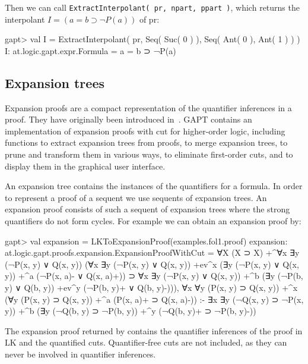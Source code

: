 \documentclass[a4paper,11pt]{article}
\newcommand{\impl}{\supset} %
\renewcommand{\lnot}{\neg}
\newcommand{\cli}[1]{{\ttfamily {#1}}}
\begin{document}
Then we can call \texttt{ExtractInterpolant( pr, npart, ppart )}, which returns the interpolant $I = (a=b \impl \lnot P(a))$ of pr:
\begin{clilisting}
gapt> val I = ExtractInterpolant( pr, Seq( Suc( 0 ) ), Seq( Ant( 0 ), Ant( 1 ) ) )
I: at.logic.gapt.expr.Formula = a = b ⊃ ¬P(a)

\end{clilisting}

\subsection{Expansion trees}

Expansion proofs are a compact representation of the quantifier inferences in a
proof.  They have originally been introduced in~\cite{Miller87Compact}.  GAPT
contains an implementation of expansion proofs with cut for higher-order logic,
including functions to extract expansion trees from proofs, to merge expansion
trees, to prune and transform them in various ways, to eliminate first-order
cuts, and to display them in the graphical user interface.

An expansion tree contains the instances of the quantifiers for a formula.  In order
to represent a proof of a sequent we use sequents of expansion trees.  An
expansion proof consists of such a sequent of expansion trees where the
strong quantifiers do not form cycles.
For example we can obtain an expansion proof by:
\begin{clilisting}
gapt> val expansion = LKToExpansionProof(examples.fol1.proof)
expansion: at.logic.gapt.proofs.expansion.ExpansionProofWithCut =
∀X (X ⊃ X)
  +^{∀x ∃y (¬P(x, y) ∨ Q(x, y))}
    (∀x ∃y (¬P(x, y) ∨ Q(x, y)) +ev^{x}
        (∃y (¬P(x, y) ∨ Q(x, y)) +^{a} (¬P(x, a)- ∨ Q(x, a)+)) ⊃
      ∀x ∃y (¬P(x, y) ∨ Q(x, y))
        +^{b} (∃y (¬P(b, y) ∨ Q(b, y)) +ev^{y} (¬P(b, y)+ ∨ Q(b, y)-))),
∀x ∀y (P(x, y) ⊃ Q(x, y))
  +^{x} (∀y (P(x, y) ⊃ Q(x, y)) +^{a} (P(x, a)+ ⊃ Q(x, a)-))
:-
∃x ∃y (¬Q(x, y) ⊃ ¬P(x, y))
  +^{b} (∃y (¬Q(b, y) ⊃ ¬P(b, y)) +^{y} (¬Q(b, y)+ ⊃ ¬P(b, y)-))

\end{clilisting}

The expansion proof returned by \cli{LKToExpansionProof} contains the
quantifier inferences of the proof in LK and the quantified cuts.
Quantifier-free cuts are not included, as they can never be involved in
quantifier inferences.
\end{document}
